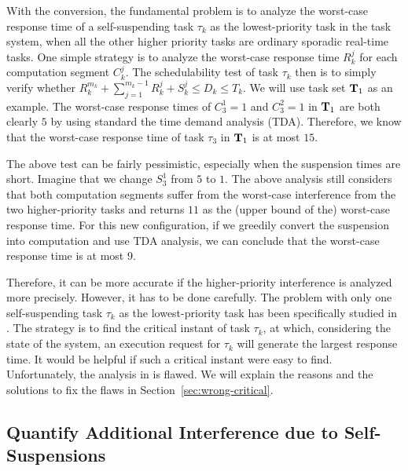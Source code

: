 \begin{table}[t]
\begin{table}[t]
With the conversion, the fundamental problem is to analyze the worst-case response time of a self-suspending task $\tau_k$ as the lowest-priority task in the task system, when all the other higher priority tasks are ordinary sporadic real-time tasks. One simple strategy is to analyze the worst-case response time $R_k^j$ for each computation segment $C_k^j$. The schedulability test of task $\tau_k$ then is to simply verify whether $R_k^{m_k} + \sum_{j=1}^{m_k-1} R_k^j + S_k^j \leq D_k \leq T_k$. We will use task set ${\bf T}_1$ as an example. The worst-case response times of $C_3^1=1$ and $C_3^2=1$ in ${\bf T}_1$ are both clearly $5$ by using standard the time demand analysis (TDA). Therefore, we know that the worst-case response time of task $\tau_3$ in ${\bf T}_1$ is at most $15$.

The above test can be fairly pessimistic, especially when the suspension times are short. Imagine that we change $S_3^1$ from $5$ to $1$. The above analysis still considers that both computation segments suffer from the worst-case interference from the two higher-priority tasks and returns $11$ as the (upper bound of the) worst-case response time. For this new configuration, if we greedily convert the suspension into computation and use TDA analysis, we can conclude that the worst-case response time is at most $9$. 

Therefore, it can be more accurate if the higher-priority interference is analyzed more precisely. However, it has to be done carefully. 
The problem with only one self-suspending task $\tau_k$ as the lowest-priority task has been specifically studied in \cite{LR:rtas10,ecrts15nelissen}. The strategy is to find the critical instant of task $\tau_k$, at which, considering the state of the system, an execution request for $\tau_k$ will generate the largest response time. It would be helpful if such a critical instant were easy to find.
Unfortunately, the analysis in \cite{LR:rtas10} is flawed. We will explain the reasons and the solutions to fix the flaws in Section~\ref{sec:wrong-critical}.




\subsection{Quantify Additional Interference due to Self-Suspensions}
\label{sec:method-quantify-interference}


\end{table}
\end{table}
